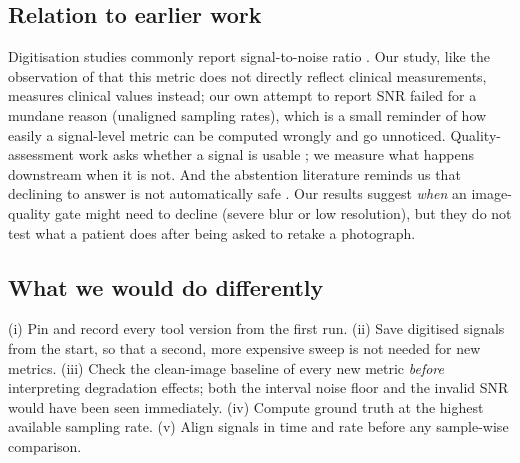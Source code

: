 \subsection{Relation to earlier work}
Digitisation studies commonly report signal-to-noise ratio \citep{ref2,ref5}. Our study, like the observation of \citet{ref2} that this metric does not directly reflect clinical measurements, measures clinical values instead; our own attempt to report SNR failed for a mundane reason (unaligned sampling rates), which is a small reminder of how easily a signal-level metric can be computed wrongly and go unnoticed. Quality-assessment work asks whether a signal is usable \citep{ref12,ref13,ref14}; we measure what happens downstream when it is not. And the abstention literature reminds us that declining to answer is not automatically safe \citep{ref26}. Our results suggest \emph{when} an image-quality gate might need to decline (severe blur or low resolution), but they do not test what a patient does after being asked to retake a photograph.

\subsection{What we would do differently}
(i) Pin and record every tool version from the first run. (ii) Save digitised signals from the start, so that a second, more expensive sweep is not needed for new metrics. (iii) Check the clean-image baseline of every new metric \emph{before} interpreting degradation effects; both the interval noise floor and the invalid SNR would have been seen immediately. (iv) Compute ground truth at the highest available sampling rate. (v) Align signals in time and rate before any sample-wise comparison.
